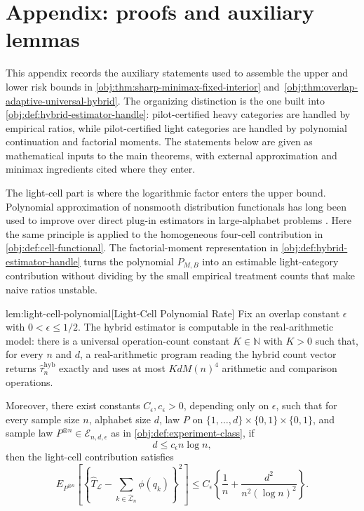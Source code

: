 \section{Appendix: proofs and auxiliary lemmas}

This appendix records the auxiliary statements used to assemble the upper and lower risk bounds in \cref{obj:thm:sharp-minimax-fixed-interior} and~\cref{obj:thm:overlap-adaptive-universal-hybrid}. The organizing distinction is the one built into \cref{obj:def:hybrid-estimator-handle}: pilot-certified heavy categories are handled by empirical ratios, while pilot-certified light categories are handled by polynomial continuation and factorial moments. The statements below are given as mathematical inputs to the main theorems, with external approximation and minimax ingredients cited where they enter.

The light-cell part is where the logarithmic factor enters the upper bound. Polynomial approximation of nonsmooth distribution functionals has long been used to improve over direct plug-in estimators in large-alphabet problems \citep{Paninski2003,Valiant2011,Valiant2017,Orlitsky2016,JiaoVenkatHanWeissman2015,WuYang2016,HanJiaoWeissman2015,HanJiaoWeissman2020,WuYang2019}. Here the same principle is applied to the homogeneous four-cell contribution in \cref{obj:def:cell-functional}. The factorial-moment representation in \cref{obj:def:hybrid-estimator-handle} turns the polynomial \(P_{M,B}\) into an estimable light-category contribution without dividing by the small empirical treatment counts that make naive ratios unstable.

\begin{lemmav}{lem:light-cell-polynomial}[Light-Cell Polynomial Rate]
Fix an overlap constant \(\epsilon\) with \(0<\epsilon\le 1/2\). The hybrid estimator is computable in the real-arithmetic model: there is a universal operation-count constant \(K\in\mathbb N\) with \(K>0\) such that, for every \(n\) and \(d\), a real-arithmetic program reading the hybrid count vector returns \(\widehat\tau_n^{\mathrm{hyb}}\) exactly and uses at most \(K d M(n)^4\) arithmetic and comparison operations.

Moreover, there exist constants \(C_\epsilon,c_\epsilon>0\), depending only on \(\epsilon\), such that for every sample size \(n\), alphabet size \(d\), law \(P\) on \(\{1,\ldots,d\}\times\{0,1\}\times\{0,1\}\), and sample law \(P^{\otimes n}\in\mathcal E_{n,d,\epsilon}\) as in \cref{obj:def:experiment-class}, if
\[
d\le c_\epsilon n\log n,
\]
then the light-cell contribution satisfies
\[
E_{P^{\otimes n}}\left[\left\{\widehat T_{\mathcal L}-\sum_{k\in\widehat{\mathcal L}_n}\phi(q_k)\right\}^2\right]
\le
C_\epsilon\left\{\frac{1}{n}+\frac{d^2}{n^2(\log n)^2}\right\}.
\]
\end{lemmav}

